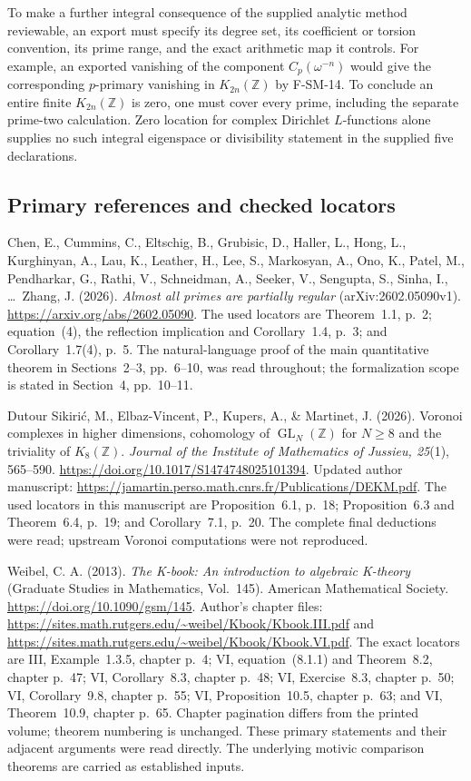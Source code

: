 To make a further integral consequence of the supplied analytic method
reviewable, an export must specify its degree set, its coefficient or
torsion convention, its prime range, and the exact arithmetic map it
controls.  For example, an exported vanishing of the component
$C_p(\omega^{-n})$ would give the corresponding $p$-primary vanishing
in $K_{2n}(\mathbb Z)$ by F-SM-14.  To conclude an entire finite
$K_{2n}(\mathbb Z)$ is zero, one must cover every prime, including the
separate prime-two calculation.  Zero location for complex Dirichlet
$L$-functions alone supplies no such integral eigenspace or
divisibility statement in the supplied five declarations.

\subsection{Primary references and checked locators}

Chen, E., Cummins, C., Eltschig, B., Grubisic, D., Haller, L.,
Hong, L., Kurghinyan, A., Lau, K., Leather, H., Lee, S.,
Markosyan, A., Ono, K., Patel, M., Pendharkar, G., Rathi, V.,
Schneidman, A., Seeker, V., Sengupta, S., Sinha, I., \ldots\
Zhang, J. (2026).
\emph{Almost all primes are partially regular}
(arXiv:2602.05090v1).
\url{https://arxiv.org/abs/2602.05090}.
The used locators are Theorem~1.1, p.~2; equation~(4),
the reflection implication and Corollary~1.4, p.~3; and
Corollary~1.7(4), p.~5.  The natural-language proof of the main
quantitative theorem in Sections~2--3, pp.~6--10, was read throughout;
the formalization scope is stated in Section~4, pp.~10--11.

Dutour Sikiri\'c, M., Elbaz-Vincent, P., Kupers, A., \& Martinet, J.
(2026). Voronoi complexes in higher dimensions, cohomology of
$\operatorname{GL}_N(\mathbb Z)$ for $N\geq8$ and the triviality of
$K_8(\mathbb Z)$.
\emph{Journal of the Institute of Mathematics of Jussieu, 25}(1),
565--590.
\url{https://doi.org/10.1017/S1474748025101394}.
Updated author manuscript:
\url{https://jamartin.perso.math.cnrs.fr/Publications/DEKM.pdf}.
The used locators in this manuscript are Proposition~6.1, p.~18;
Proposition~6.3 and Theorem~6.4, p.~19; and Corollary~7.1, p.~20.
The complete final deductions were read; upstream Voronoi
computations were not reproduced.

Weibel, C. A. (2013).
\emph{The K-book: An introduction to algebraic K-theory}
(Graduate Studies in Mathematics, Vol.~145).
American Mathematical Society.
\url{https://doi.org/10.1090/gsm/145}.
Author's chapter files:
\url{https://sites.math.rutgers.edu/~weibel/Kbook/Kbook.III.pdf}
and
\url{https://sites.math.rutgers.edu/~weibel/Kbook/Kbook.VI.pdf}.
The exact locators are III, Example~1.3.5, chapter p.~4;
VI, equation~(8.1.1) and Theorem~8.2, chapter p.~47;
VI, Corollary~8.3, chapter p.~48; VI, Exercise~8.3, chapter p.~50;
VI, Corollary~9.8, chapter p.~55; VI, Proposition~10.5,
chapter p.~63; and VI, Theorem~10.9, chapter p.~65.
Chapter pagination differs from the printed volume; theorem
numbering is unchanged.  These primary statements and their
adjacent arguments were read directly.  The underlying motivic
comparison theorems are carried as established inputs.
